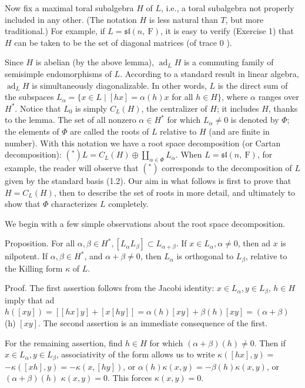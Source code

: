 \documentclass[10pt]{article}
\begin{document}
Now fix a maximal toral subalgebra $H$ of $L$, i.e., a toral subalgebra not properly included in any other. (The notation $H$ is less natural than $T$, but more traditional.) For example, if $L=\mathfrak{s l}(n, \mathrm{~F})$, it is easy to verify (Exercise 1) that $H$ can be taken to be the set of diagonal matrices (of trace 0 ).

Since $H$ is abelian (by the above lemma), $\operatorname{ad}_{L} H$ is a commuting family of semisimple endomorphisms of $L$. According to a standard result in linear algebra, $\operatorname{ad}_{L} H$ is simultaneously diagonalizable. In other words, $L$ is the direct sum of the subspaces $L_{\alpha}=\{x \in L \mid[h x]=\alpha(h) x$ for all $h \in H\}$, where $\alpha$ ranges over $H^{*}$. Notice that $L_{0}$ is simply $C_{L}(H)$, the centralizer of $H$; it includes $H$, thanks to the lemma. The set of all nonzero $\alpha \in H^{*}$ for which $L_{\alpha} \neq 0$ is denoted by $\Phi$; the elements of $\Phi$ are called the roots of $L$ relative to $H$ (and are finite in number). With this notation we have a root space decomposition (or Cartan decomposition): $\left({ }^{*}\right) L=C_{L}(H) \oplus \coprod_{\alpha \in \Phi} L_{\alpha}$. When $L=\mathfrak{s l}(n, \mathrm{~F})$, for example, the reader will observe that $\left({ }^{*}\right)$ corresponds to the decomposition of $L$ given by the standard basis (1.2). Our aim in what follows is first to prove that $H=C_{L}(H)$, then to describe the set of roots in more detail, and ultimately to show that $\Phi$ characterizes $L$ completely.

We begin with a few simple observations about the root space decomposition.

Proposition. For all $\alpha, \beta \in H^{*},\left[L_{\alpha} L_{\beta}\right] \subset L_{\alpha+\beta}$. If $x \in L_{\alpha}, \alpha \neq 0$, then ad $x$ is nilpotent. If $\alpha, \beta \in H^{*}$, and $\alpha+\beta \neq 0$, then $L_{\alpha}$ is orthogonal to $L_{\beta}$, relative to the Killing form $\kappa$ of $L$.

Proof. The first assertion follows from the Jacobi identity: $x \in L_{\alpha}, y \in L_{\beta}$, $h \in H$ imply that ad $h([x y])=[[h x] y]+[x[h y]]=\alpha(h)[x y]+\beta(h)[x y]=(\alpha+\beta)$ (h) $[x y]$. The second assertion is an immediate consequence of the first.

For the remaining assertion, find $h \in H$ for which $(\alpha+\beta)(h) \neq 0$. Then if $x \in L_{\alpha}, y \in L_{\beta}$, associativity of the form allows us to write $\kappa([h x], y)=$ $-\kappa([x h], y)=-\kappa(x,[h y])$, or $\alpha(h) \kappa(x, y)=-\beta(h) \kappa(x, y)$, or $(\alpha+\beta)(h)$ $\kappa(x, y)=0$. This forces $\kappa(x, y)=0$.
\end{document}
